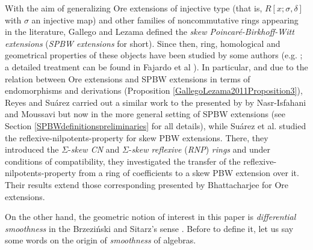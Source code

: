 \documentclass{amsart}
\theoremstyle{definition}
\theoremstyle{remark}
\numberwithin{equation}{section}
\begin{document}
With the aim of generalizing Ore extensions of injective type (that is, $R[x; \sigma, \delta]$ with $\sigma$ an injective map) and other families of noncommutative rings appearing in the literature, Gallego and Lezama \cite{GallegoLezama2011} defined the {\em skew Poincar\'e-Birkhoff-Witt extensions} ({\em SPBW extensions} for short). Since then, ring, homological and geometrical properties of these objects have been studied by some authors (e.g. \cite{AbdiTalebi2023, Artamonov2015, Hamidizadehetal2020, HigueraReyes2023, LezamaReyes2014, NinoRamirezReyes2020, ReyesSuarez2020, ReyesSuarez2021Radicals}; a detailed treatment can be found in Fajardo et al \cite{Fajardoetal2020}). In particular, and due to the relation between Ore extensions and SPBW extensions in terms of endomorphisms and derivations (Proposition \ref{GallegoLezama2011Proposition3}), Reyes and Su\'arez \cite{ReyesSuarez2017} carried out a similar work to the presented by by Nasr-Isfahani and Moussavi \cite{NasrMoussavi2008} but now in the more general setting of SPBW extensions (see Section \ref{SPBWdefinitionspreliminaries} for all details), while Su\'arez et al. \cite{SuarezHigueraReyes2024} studied the reflexive-nilpotents-property for skew PBW extensions. There, they introduced the $\Sigma$-{\em skew CN} and $\Sigma$-{\em skew reflexive} ({\em RNP}) {\em rings} and under conditions of compatibility, they investigated the transfer of the reflexive-nilpotents-property from a ring of coefficients to a skew PBW extension over it. Their results extend those corresponding presented by Bhattacharjee \cite{Bhattacharjee2020} for Ore extensions.

On the other hand, the geometric notion of interest in this paper is {\em differential smoothness} in the Brzezi\'nski and Sitarz's sense \cite{BrzezinskiSitarz2017}. Before to define it, let us say some words on the origin of {\em smoothness} of algebras.
\end{document}
